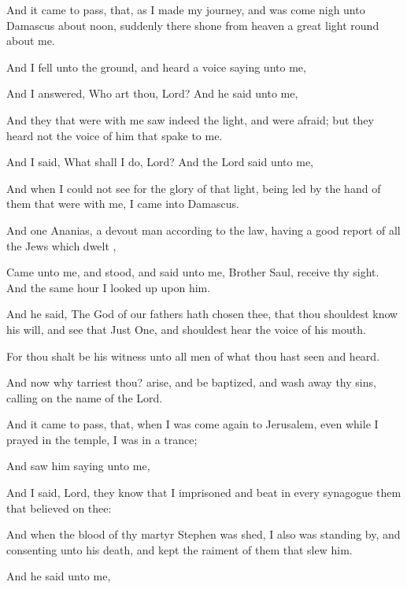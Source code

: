 {And it came to pass,
that, as
I made my
journey,
and was come
nigh unto
Damascus
about
noon,
suddenly there
shone
from
heaven a
great
light round
about
me.

And I
fell
unto the
ground,
and
heard a
voice
saying unto
me,
{}

And
I
answered,
Who art
thou,
Lord?
And he
said
unto
me,
{}

And
they that
were
with
me
saw
indeed the
light,
and
were
afraid;
but they
heard
not the
voice of
him that
spake to
me.

And I
said,
What shall I
do,
Lord?
And the
Lord
said
unto
me,
{}

And
when I
could
not
see
for the
glory of
that
light, being led by the
hand
of
them that were
with
me, I
came
into
Damascus.

And
one
Ananias, a
devout
man according
to the
law, having a good
report
of
all the
Jews which
dwelt
{},

Came
unto
me,
and
stood, and
said unto
me,
Brother
Saul, receive thy
sight.
And the
same
hour
I looked
up
upon
him.

And he
said, The
God of
our
fathers hath
chosen
thee, that thou shouldest
know
his
will,
and
see
that Just
One,
and shouldest
hear the
voice
of
his
mouth.

For thou shalt
be
his
witness
unto
all
men of
what thou hast
seen
and
heard.

And
now
why tarriest
thou?
arise, and be
baptized,
and wash
away
thy
sins, calling
on the
name of the
Lord.

And it came to pass,
that, when
I was come
again
to
Jerusalem,
even while
I
prayed
in the
temple,
I
was
in a
trance;

And
saw
him
saying unto
me,
{}

And
I
said,
Lord,
they
know
that
I
imprisoned
and
beat in
every
synagogue them
that
believed
on
thee:

And
when the
blood of
thy
martyr
Stephen was
shed,
I
also
was standing
by,
and consenting
unto
his
death,
and
kept the
raiment of
them that
slew
him.

And he
said
unto
me,
{}

}
